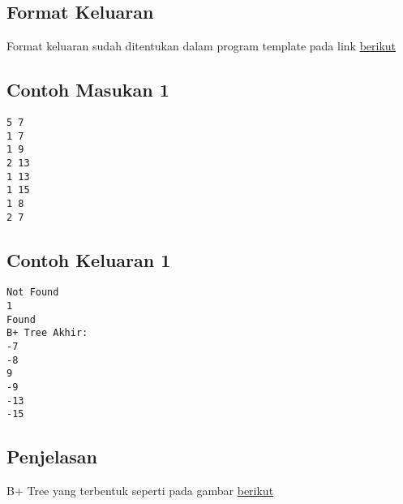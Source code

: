 \documentclass{article}
\begin{document}
\subsection*{Format Keluaran}

Format keluaran sudah ditentukan dalam program template pada link \href{https://drive.google.com/drive/folders/19CcSmHoxypupEgl6w9DckooEcUfqM3qY?usp=sharing}{berikut}

\begin{multicols}{2}
\subsection*{Contoh Masukan 1}
\begin{lstlisting}
5 7
1 7
1 9
2 13
1 13
1 15
1 8
2 7
\end{lstlisting}
\columnbreak
\subsection*{Contoh Keluaran 1}
\begin{lstlisting}
Not Found
1
Found
B+ Tree Akhir:
-7
-8
9
-9
-13
-15
\end{lstlisting}
\vfill
\null
\end{multicols}


\subsection*{Penjelasan}

B+ Tree yang terbentuk seperti pada gambar \href{https://drive.google.com/file/d/1pot9zNXOrSjS-J8ebY-b_D8aXAC7xbT4/view?usp=sharing}{berikut}
\end{document}
